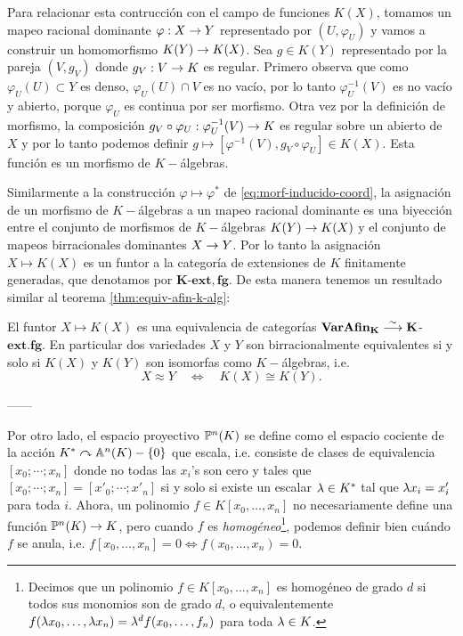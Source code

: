 \documentclass[../../tesis_maestria]{subfiles}
\begin{document}
Para relacionar esta contrucción con el campo de funciones $K(X)$, tomamos un mapeo racional dominante $\varphi:X\rightarrow Y$ representado por $(U,\varphi_U)$ y vamos a construir un homomorfismo $K(Y)\rightarrow K(X)$. Sea $g\in K(Y)$ representado por la pareja $(V,g_V)$ donde $g_V:V\rightarrow K$ es regular. Primero observa que como $\varphi_U(U)\subset Y$ es denso, $\varphi_U(U)\cap V$ es no vacío, por lo tanto $\varphi^{-1}_U(V)$ es no vacío y abierto, porque $\varphi_U$ es continua por ser morfismo. Otra vez por la definición de morfismo, la composición $g_V\circ\varphi_U:\varphi_U^{-1}(V)\rightarrow K$ es regular sobre un abierto de $X$ y por lo tanto podemos definir $g\mapsto[\varphi^{-1}(V),g_V\circ\varphi_U]\in K(X)$. Esta función es un morfismo de $K-$álgebras.

Similarmente a la construcción $\varphi\mapsto\varphi^*$ de \eqref{eq:morf-inducido-coord}, la asignación de un morfismo de $K-$álgebras a un mapeo racional dominante es una biyección entre el conjunto de morfismos de $K-$álgebras $K(Y)\rightarrow K(X)$ y el conjunto de mapeos birracionales dominantes $X\rightarrow Y$. Por lo tanto la asignación $X\mapsto K(X)$ es un funtor a la categoría de extensiones de $K$ finitamente generadas, que denotamos por $\mathbf{K}$-$\mathbf{ext,fg}$. De esta manera tenemos un resultado similar al teorema \ref{thm:equiv-afin-k-alg}:

\begin{thm}
	El funtor $X\mapsto K(X)$ es una equivalencia de categorías $\mathbf{VarAfin_K} \overset{\sim}{\longrightarrow}\mathbf{K}$-$\mathbf{ext.fg}$. En particular dos variedades $X$ y $Y$ son birracionalmente equivalentes si y solo si $K(X)$ y $K(Y)$ son isomorfas como $K-$álgebras, i.e.
	\[
		X\approx Y\quad\iff\quad K(X)\cong K(Y).
	\]
\end{thm}


------

Por otro lado, el espacio proyectivo $\mathbb{P}^n(K)$ se define como el espacio cociente de la acción $K^*\curvearrowright\mathbb{A}^n(K)-\{0\}$ que escala, i.e. consiste de clases de equivalencia $[x_0;\cdots;x_n]$ donde no todas las $x_i$'s son cero y tales que $[x_0;\cdots;x_n]=[x'_0;\cdots;x'_n]$ si y solo si existe un escalar $\lambda\in K^*$ tal que $\lambda x_i=x'_i$ para toda $i$. Ahora, un polinomio $f\in K[x_0,\ldots,x_n]$ no necesariamente define una función $\mathbb{P}^n(K)\rightarrow K$, pero cuando $f$ es \emph{homogéneo}\footnote{Decimos que un polinomio $f\in K[x_0,\ldots,x_n]$ es homogéneo de grado $d$ si todos sus monomios son de grado $d$, o equivalentemente $f(\lambda x_0,\ldots,\lambda x_n)=\lambda^d f(x_0,\ldots,f_n)$ para toda $\lambda\in K$.}, podemos definir bien cuándo $f$ se anula, i.e. $f[x_0,\ldots,x_n]=0\iff f(x_0,\ldots,x_n)=0$.
\end{document}
